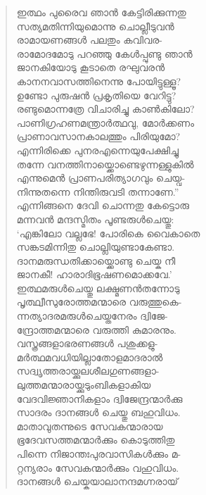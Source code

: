 \begin{verse}
ഇത്ഥം പുരൈവ ഞാന്‍ കേട്ടിരിക്കുന്നതു\\
സത്യമതിന്നിയുമൊന്നു ചൊല്ലീടുവന്‍\\
രാമായണങ്ങള്‍ പലതും കവിവര-\\
രാമോദമോടു പറഞ്ഞു കേള്‍പ്പുണ്ടു ഞാന്‍\\
ജാനകിയോടു കൂടാതെ രഘുവരന്‍\\
കാനനവാസത്തിനെന്നു പോയിട്ടുള്ളൂ?\\
ഉണ്ടോ പുരുഷന്‍ പ്രകൃതിയെ വേറിട്ടു?\\
രണ്ടുമൊന്നത്രേ വിചാരിച്ചു കാണ്‍കിലോ?\\
പാണിഗ്രഹണമന്ത്രാര്‍ത്ഥവു, മോര്‍ക്കണം\\
പ്രാണാവസാനകാലത്തും പിരിയുമോ?\\
എന്നിരിക്കെ പുനരഎന്നെയുപേക്ഷിച്ചു\\
തന്നേ വനത്തിനായ്ക്കൊണ്ടെഴുന്നള്ളുകില്‍\\
എന്നുമെന്‍ പ്രാണപരിത്യാഗവും ചെയ്വ-\\
നിന്നുതന്നെ നിന്തിരുവടി തന്നാണേ.”\\
എന്നിങ്ങനെ ദേവി ചൊന്നതു കേട്ടൊരു\\
മന്നവന്‍ മന്ദസ്മിതം പൂണ്ടരുള്‍ചെയ്തു:\\
‘എങ്കിലോ വല്ലഭേ! പോരികെ വൈകാതെ\\
സങ്കടമിന്നിതു ചൊല്ലിയുണ്ടാകേണ്ടാ.\\
ദാനമരുന്ധതിക്കായ്ക്കൊണ്ടു ചെയ്ക നീ\\
ജാനകീ! ഹാരാദിഭൂഷണമൊക്കവേ.’\\
ഇത്ഥമരുള്‍ചെയ്തു ലക്ഷ്മണന്‍തന്നോടു\\
പൃത്ഥ്വീസുരോത്തമന്മാരെ വരുത്തുകെ-\\
ന്നത്യാദരമരുള്‍ചെയ്തനേരം ദ്വിജേ-\\
ന്ദ്രോത്തമന്മാരെ വരുത്തി കുമാരനും.\\
വസ്ത്രങ്ങളാഭരണങ്ങള്‍ പശുക്കളു-\\
മര്‍ത്ഥമവധിയില്ലാതോളമാദരാല്‍\\
സദ്വൃത്തരായ്ക്കുലശീലഗുണങ്ങളാ-\\
ലുത്തമന്മാരായ്ക്കുടുംബികളാകിയ\\
വേദവിജ്ഞാനികളാം ദ്വിജേന്ദ്രന്മാര്‍ക്കു\\
സാദരം ദാനങ്ങള്‍ ചെയ്തു ബഹുവിധം.\\
മാതാവുതന്നുടെ സേവകന്മാരായ\\
ഭൂദേവസത്തമന്മാര്‍ക്കും കൊടുത്തിതു\\
പിന്നെ നിജാന്തഃപുരവാസികള്‍ക്കും മ-\\
റ്റന്യരാം സേവകന്മാര്‍ക്കും വഹുവിധം.\\
ദാനങ്ങള്‍ ചെയ്കയാലാനന്ദമഗ്നരായ്\\

\end{verse}
